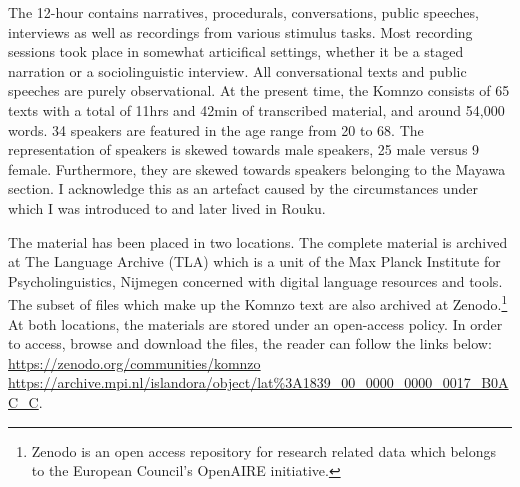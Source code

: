 The 12-hour  contains narratives, procedurals, conversations, public speeches, interviews as well as recordings from various stimulus tasks. Most recording sessions took place in somewhat articifical settings, whether it be a staged narration or a sociolinguistic interview. All conversational texts and public speeches are purely observational. At the present time, the Komnzo  consists of 65 texts with a total of 11hrs and 42min of transcribed material, and around 54,000 words. 34 speakers are featured in the age range from 20 to 68. The representation of speakers is skewed towards male speakers, 25 male versus 9 female. Furthermore, they are skewed towards speakers belonging to the Mayawa section. I acknowledge this as an artefact caused by the circumstances under which I was introduced to and later lived in Rouku.%

The material has been placed in two locations. The complete material is archived at The Language Archive (TLA) which is a unit of the Max Planck Institute for Psycholinguistics, Nijmegen concerned with digital language resources and tools. The subset of files which make up the Komnzo text  are also archived at Zenodo.\footnote{Zenodo is an open access repository for research related data which belongs to the European Council's OpenAIRE initiative.} At both locations, the materials are stored under an open-access policy. In order to access, browse and download the files, the reader can follow the links below:%
\url{https://zenodo.org/communities/komnzo}
\url{https://archive.mpi.nl/islandora/object/lat\%3A1839_00_0000_0000_0017_B0AC_C}.

